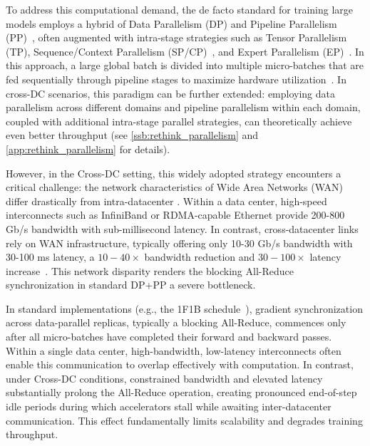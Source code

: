 To address this computational demand, the de facto standard for training large models employs a hybrid of Data Parallelism (DP) and Pipeline Parallelism (PP)~\cite{narayanan2021efficient, shoeybi2019megatron}, often augmented with intra-stage strategies such as Tensor Parallelism (TP), Sequence/Context Parallelism (SP/CP)~\cite{narayanan2021efficient}, and Expert Parallelism (EP)~\cite{lepikhin2020gshard}. In this approach, a large global batch is divided into multiple micro-batches that are fed sequentially through pipeline stages to maximize hardware utilization~\cite{narayanan2021efficient, shoeybi2019megatron}. 
In cross-DC scenarios, this paradigm can be further extended: employing data parallelism across different domains and pipeline parallelism within each domain, coupled with additional intra-stage parallel strategies, can theoretically achieve even better throughput (see \ref{ssb:rethink_parallelism} and \ref{app:rethink_parallelism} for details).

However, in the Cross-DC setting, this widely adopted strategy encounters a critical challenge: the network characteristics of Wide Area Networks (WAN) differ drastically from intra-datacenter . Within a data center, high-speed interconnects such as InfiniBand or RDMA-capable Ethernet provide 200-800 Gb/s bandwidth with sub-millisecond latency. In contrast, cross-datacenter links rely on WAN infrastructure, typically offering only 10-30 Gb/s bandwidth with 30-100 ms latency, a $10-40\times$ bandwidth reduction and $30-100\times$ latency increase~\cite{yu2023cross}. This network disparity renders the blocking All-Reduce synchronization in standard DP+PP a severe bottleneck.

In standard implementations (e.g., the 1F1B schedule~\cite{narayanan2021efficient}), gradient synchronization across data-parallel replicas, typically a blocking All-Reduce, commences only after all micro-batches have completed their forward and backward passes. Within a single data center, high-bandwidth, low-latency interconnects often enable this communication to overlap effectively with computation. In contrast, under Cross-DC conditions, constrained bandwidth and elevated latency substantially prolong the All-Reduce operation, creating pronounced end-of-step idle periods during which accelerators stall while awaiting inter-datacenter communication. This effect fundamentally limits scalability and degrades training throughput.


